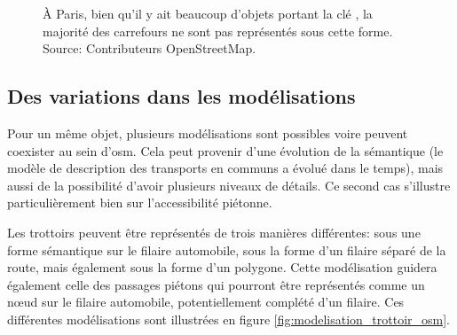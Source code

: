 \begin{figure}[ht]
    \centering
    \caption[Les carrefours dans OpenStreetMap à Paris]{À Paris, bien qu'il y ait beaucoup d'objets portant la clé , la majorité des carrefours ne sont pas représentés sous cette forme. Source: Contributeurs OpenStreetMap.}
    \label{fig:modelisation_carrefours_osm_paris}
\end{figure}

\subsection{Des variations dans les modélisations}

\label{sec:modelisation_variation_pieton_osm}


Pour un même objet, plusieurs modélisations sont possibles voire peuvent coexister au sein d'\gls{osm}. Cela peut provenir d'une évolution de la sémantique (le modèle de description des transports en communs a évolué dans le temps), mais aussi de la possibilité d'avoir plusieurs niveaux de détails. Ce second cas s'illustre particulièrement bien sur l'accessibilité piétonne.

\newpar{}

Les trottoirs peuvent être représentés de trois manières différentes: sous une forme sémantique sur le filaire automobile, sous la forme d'un filaire séparé de la route, mais également sous la forme d'un polygone. Cette modélisation guidera également celle des passages piétons qui pourront être représentés comme un nœud sur le filaire automobile, potentiellement complété d'un filaire. Ces différentes modélisations sont illustrées en figure \ref{fig:modelisation_trottoir_osm}.

